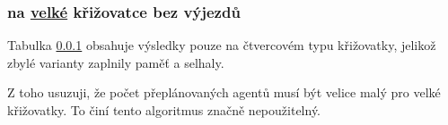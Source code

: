 \subsubsection{ na \hyperref[par:data_velka]{velké} křižovatce bez výjezdů}
\label{subsubsec:exp_aoid_velka_krizovatka_bez_vyjezdu}



Tabulka \ref{subsubsec:exp_aoid_velka_krizovatka_bez_vyjezdu} obsahuje výsledky pouze na čtvercovém typu křižovatky,
jelikož zbylé varianty zaplnily paměť a selhaly.

Z toho usuzuji, že počet přeplánovaných agentů musí být velice malý pro velké křižovatky.
To činí tento algoritmus značně nepoužitelný.